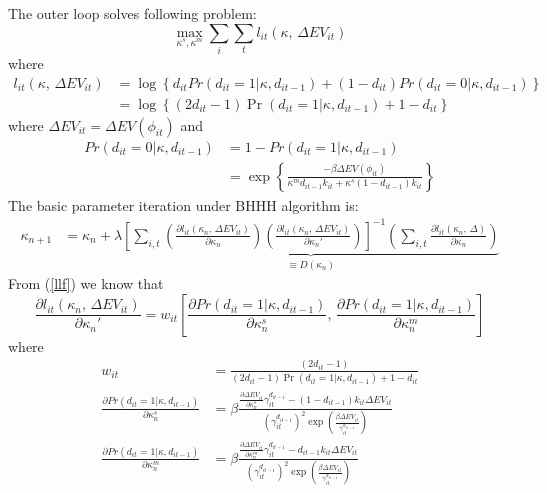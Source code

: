 The outer loop solves following problem:
\[
\max_{\kappa^{s},\kappa^{m}}\sum_{i}\sum_{t}l_{it}\left(\kappa,\,\Delta EV_{it}\right)
\]
 where 
\begin{align}
l_{it}\left(\kappa,\,\Delta EV_{it}\right) & =\log\left\{ d_{it}Pr\left(d_{it}=1|\kappa,d_{it-1}\right)+\left(1-d_{it}\right)Pr\left(d_{it}=0|\kappa,d_{it-1}\right)\right\} \label{llf}\\
 & =\log\left\{ \left(2d_{it}-1\right)\Pr\left(d_{it}=1|\kappa,d_{it-1}\right)+1-d_{it}\right\} \nonumber 
\end{align}
where $\Delta EV_{it}=\Delta EV\left(\phi_{it}\right)$ and 
\begin{align}
Pr\left(d_{it}=0|\kappa,d_{it-1}\right) & =1-Pr\left(d_{it}=1|\kappa,d_{it-1}\right)\\
 & =\exp\left\{ \frac{-\beta\Delta EV\left(\phi_{it}\right)}{\kappa^{m}d_{it-1}k_{it}+\kappa^{s}\left(1-d_{it-1}\right)k_{it}}\right\} \nonumber 
\end{align}
The basic parameter iteration under BHHH algorithm is:
\begin{align*}
\kappa_{n+1} & =\kappa_{n}+\lambda\underset{\equiv D\left(\kappa_{n}\right)}{\underbrace{\left[\sum_{i,t}\left(\frac{\partial l_{it}\left(\kappa_{n},\,\Delta EV_{it}\right)}{\partial\kappa_{n}}\right)\left(\frac{\partial l_{it}\left(\kappa_{n},\,\Delta EV_{it}\right)}{\partial\kappa_{n}'}\right)\right]^{-1}\left(\sum_{i,t}\frac{\partial l_{it}\left(\kappa_{n},\,\Delta\right)}{\partial\kappa_{n}}\right)}}
\end{align*}
From (\ref{llf}) we know that 
\begin{equation}
\frac{\partial l_{it}\left(\kappa_{n},\,\Delta EV_{it}\right)}{\partial\kappa_{n}'}=w_{it}\left[\frac{\partial Pr\left(d_{it}=1|\kappa,d_{it-1}\right)}{\partial\kappa_{n}^{s}},\,\frac{\partial Pr\left(d_{it}=1|\kappa,d_{it-1}\right)}{\partial\kappa_{n}^{m}}\right]
\end{equation}
where
\begin{align*}
w_{it} & =\frac{\left(2d_{it}-1\right)}{\left(2d_{it}-1\right)\Pr\left(d_{it}=1|\kappa,d_{it-1}\right)+1-d_{it}}\\
\frac{\partial Pr\left(d_{it}=1|\kappa,d_{it-1}\right)}{\partial\kappa_{n}^{s}} & =\beta\frac{\frac{\partial\Delta EV_{it}}{\partial\kappa_{n}^{s}}\gamma_{it}^{d_{it-1}}-\left(1-d_{it-1}\right)k_{it}\Delta EV_{it}}{\left(\gamma_{it}^{d_{it-1}}\right)^{2}\exp\left(\frac{\beta\Delta EV_{it}}{\gamma_{it}^{d_{it-1}}}\right)}\\
\frac{\partial Pr\left(d_{it}=1|\kappa,d_{it-1}\right)}{\partial\kappa_{n}^{m}} & =\beta\frac{\frac{\partial\Delta EV_{it}}{\partial\kappa_{n}^{m}}\gamma_{it}^{d_{it-1}}-d_{it-1}k_{it}\Delta EV_{it}}{\left(\gamma_{it}^{d_{it-1}}\right)^{2}\exp\left(\frac{\beta\Delta EV_{it}}{\gamma_{it}^{d_{it-1}}}\right)}
\end{align*}

